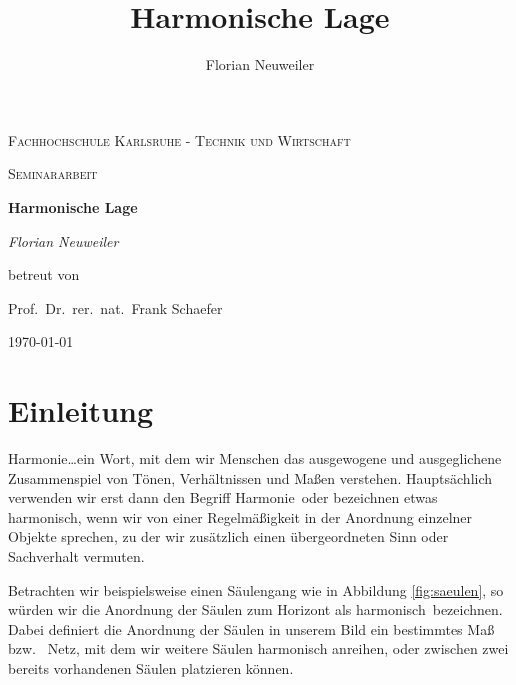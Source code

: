 \documentclass[12pt,a4paper]{article}
\author{Florian Neuweiler}
\date{}
\title{Harmonische Lage}
\begin{document}

\setlength{\columnsep}{1.5cm}
\setlength{\columnseprule}{1pt}

\theoremstyle{definition}

\begin{titlepage}
\centering
{\scshape\LARGE Fachhochschule Karlsruhe - Technik und Wirtschaft \par}
\vspace{1cm}
{\scshape\Large Seminararbeit\par}
\vspace{1.5cm}
{\huge\bfseries Harmonische Lage\par}
\vspace{1.5cm}
{\Large\itshape Florian Neuweiler\par}
\vspace{1.5cm}
betreut von\par
Prof.~Dr.~rer.~nat.~Frank Schaefer
\vspace{2cm}

\vfill
{\large \today\par}
\end{titlepage}

\newpage
\tableofcontents

\newpage

\setlength{\parindent}{0pt}

\section{Einleitung}
Harmonie\dots ein Wort, mit dem wir Menschen das ausgewogene und ausgeglichene Zusammenspiel von Tönen, Verhältnissen und Maßen verstehen. Hauptsächlich verwenden wir erst dann den Begriff \glqq Harmonie\grqq ~oder bezeichnen etwas \glqq harmonisch\grqq , wenn wir von einer Regelmäßigkeit in der Anordnung einzelner Objekte sprechen, zu der wir zusätzlich einen übergeordneten Sinn oder Sachverhalt vermuten.

Betrachten wir beispielsweise einen Säulengang wie in Abbildung \ref{fig:saeulen}, so würden wir die Anordnung der Säulen zum Horizont als \glqq harmonisch\grqq ~bezeichnen. Dabei definiert die Anordnung der Säulen in unserem Bild ein bestimmtes Maß bzw.~ Netz, mit dem wir weitere Säulen harmonisch anreihen, oder zwischen zwei bereits vorhandenen Säulen platzieren können.
\end{document}
